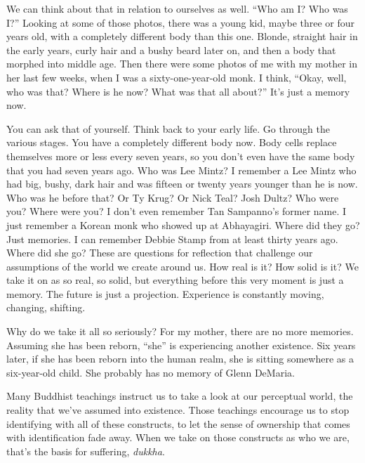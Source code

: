 \enlargethispage{1\baselineskip}
We can think about that in relation to ourselves as well. ``Who am I? Who was I?'' Looking at some of those photos, there was a young kid, maybe three or four years old, with a completely different body than this one. Blonde, straight hair in the early years, curly hair and a bushy beard later on, and then a body that morphed into middle age. Then there were some photos of me with my mother in her last few weeks, when I was a sixty-one-year-old monk. I think, ``Okay, well, who was that? Where is he now? What was that all about?'' It's just a memory now.

You can ask that of yourself. Think back to your early life. Go through the various stages. You have a completely different body now. Body cells replace themselves more or less every seven years, so you don't even have the same body that you had seven years ago. Who was Lee Mintz? I remember a Lee Mintz who had big, bushy, dark hair and was fifteen or twenty years younger than he is now. Who was he before that? Or Ty Krug? Or Nick Teal? Josh Dultz? Who were you? Where were you? I don't even remember Tan Sampanno's former name. I just remember a Korean monk who showed up at Abhayagiri. Where did they go? Just memories. I can remember Debbie Stamp from at least thirty years ago. Where did she go? These are questions for reflection that challenge our assumptions of the world we create around us. How real is it? How solid is it? We take it on as so real, so solid, but everything before this very moment is just a memory. The future is just a projection. Experience is constantly moving, changing, shifting.

Why do we take it all so seriously? For my mother, there are no more memories. Assuming she has been reborn, ``she'' \linebreak is experiencing another existence. Six years later, if she \linebreak has been reborn into the human realm, she is sitting somewhere as a six-year-old child. She probably has no memory \linebreak of Glenn DeMaria.

\enlargethispage{1.5\baselineskip}
Many Buddhist teachings instruct us to take a look at our perceptual world, the reality that we've assumed into existence. Those teachings encourage us to stop identifying with all of these constructs, to let the sense of ownership that comes with identification fade away. When we take on those constructs as who we are, that's the basis for suffering, \emph{dukkha}.

